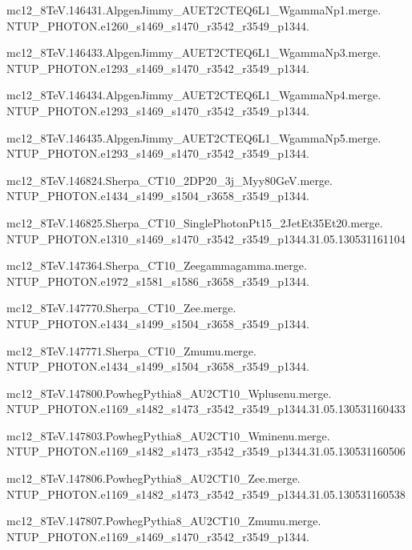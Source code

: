 mc12\_8TeV.146431.AlpgenJimmy\_AUET2CTEQ6L1\_WgammaNp1.merge. \\NTUP\_PHOTON.e1260\_s1469\_s1470\_r3542\_r3549\_p1344.

mc12\_8TeV.146433.AlpgenJimmy\_AUET2CTEQ6L1\_WgammaNp3.merge. \\NTUP\_PHOTON.e1293\_s1469\_s1470\_r3542\_r3549\_p1344.

mc12\_8TeV.146434.AlpgenJimmy\_AUET2CTEQ6L1\_WgammaNp4.merge. \\NTUP\_PHOTON.e1293\_s1469\_s1470\_r3542\_r3549\_p1344.

mc12\_8TeV.146435.AlpgenJimmy\_AUET2CTEQ6L1\_WgammaNp5.merge. \\NTUP\_PHOTON.e1293\_s1469\_s1470\_r3542\_r3549\_p1344.

mc12\_8TeV.146824.Sherpa\_CT10\_2DP20\_3j\_Myy80GeV.merge. \\NTUP\_PHOTON.e1434\_s1499\_s1504\_r3658\_r3549\_p1344.

mc12\_8TeV.146825.Sherpa\_CT10\_SinglePhotonPt15\_2JetEt35Et20.merge. \\NTUP\_PHOTON.e1310\_s1469\_s1470\_r3542\_r3549\_p1344.31.05.130531161104

mc12\_8TeV.147364.Sherpa\_CT10\_Zeegammagamma.merge. \\NTUP\_PHOTON.e1972\_s1581\_s1586\_r3658\_r3549\_p1344.

mc12\_8TeV.147770.Sherpa\_CT10\_Zee.merge. \\NTUP\_PHOTON.e1434\_s1499\_s1504\_r3658\_r3549\_p1344.

mc12\_8TeV.147771.Sherpa\_CT10\_Zmumu.merge. \\NTUP\_PHOTON.e1434\_s1499\_s1504\_r3658\_r3549\_p1344.

mc12\_8TeV.147800.PowhegPythia8\_AU2CT10\_Wplusenu.merge. \\NTUP\_PHOTON.e1169\_s1482\_s1473\_r3542\_r3549\_p1344.31.05.130531160433

mc12\_8TeV.147803.PowhegPythia8\_AU2CT10\_Wminenu.merge. \\NTUP\_PHOTON.e1169\_s1482\_s1473\_r3542\_r3549\_p1344.31.05.130531160506

mc12\_8TeV.147806.PowhegPythia8\_AU2CT10\_Zee.merge. \\NTUP\_PHOTON.e1169\_s1482\_s1473\_r3542\_r3549\_p1344.31.05.130531160538

mc12\_8TeV.147807.PowhegPythia8\_AU2CT10\_Zmumu.merge. \\NTUP\_PHOTON.e1169\_s1469\_s1470\_r3542\_r3549\_p1344.

